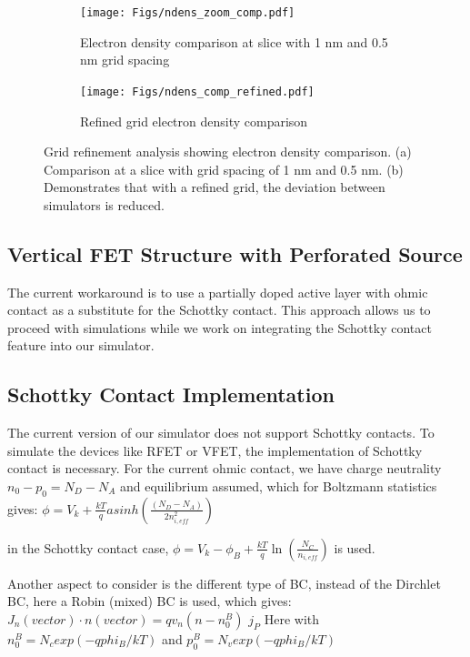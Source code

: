 \documentclass{article}
\begin{document}
\begin{figure}[H]
    \centering
    \begin{subfigure}[b]{0.48\textwidth}
        \centering
        \texttt{[image: Figs/ndens\_zoom\_comp.pdf]}
        \caption{Electron density comparison at slice with 1 nm and 0.5 nm grid spacing}
        \label{fig:ndens_zoom}
    \end{subfigure}
    \hfill
    \begin{subfigure}[b]{0.48\textwidth}
        \centering
        \texttt{[image: Figs/ndens\_comp\_refined.pdf]}
        \caption{Refined grid electron density comparison}
        \label{fig:ndens_refined}
    \end{subfigure}
    \caption{Grid refinement analysis showing electron density comparison. (a) Comparison at a slice with grid spacing of 1 nm and 0.5 nm. (b) Demonstrates that with a refined grid, the deviation between simulators is reduced.}
    \label{fig:refined_comparison}
\end{figure}

\subsection{Vertical FET Structure with Perforated Source}
 The current workaround is to use a partially doped active layer with ohmic contact as a substitute for the Schottky contact. This approach allows us to proceed with simulations while we work on integrating the Schottky contact feature into our simulator.

\subsection{Schottky Contact Implementation}
The current version of our simulator does not support Schottky contacts. To simulate the devices like RFET or VFET, the implementation of Schottky contact is necessary.
For the current ohmic contact, we have charge neutrality $n_0-p_0 = N_D - N_A$ and equilibrium assumed, which for Boltzmann statistics gives:
$\phi = V_k + \frac{kT}{q} asinh \left( \frac{(N_D - N_A)}{2 n^2_{i,eff}} \right)$

in the Schottky contact case,
$\phi = V_k - \phi_B + \frac{kT}{q} \ln \left( \frac{N_C}{n_{i,eff}} \right)$
is used.

Another aspect to consider is the different type of BC, instead of the Dirchlet BC, here a Robin (mixed) BC is used, which gives:
$J_n (vector) \cdot n(vector) = q v_n (n-n^B_0)$
$j_P$ Here
with
$n^B_0 = N_c exp(-qphi_B/kT)$
and $p^B_0 = N_v exp(-qphi_B/kT)$
\end{document}
